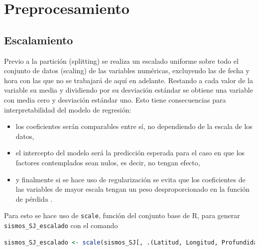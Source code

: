 \documentclass[a4paper]{report}
\begin{document}




\section{Preprocesamiento}


\subsection{Escalamiento}\label{sec:escalamiento}
Previo a la partición (splitting) se realiza un escalado uniforme sobre todo el conjunto de datos (scaling) de las variables numéricas, excluyendo las de fecha y hora con las que no se trabajará de aquí en adelante.
Restando a cada valor de la variable su media y dividiendo por su desviación estándar se obtiene una variable con media cero y desviación estándar uno. 
Esto tiene consecuencias para interpretabilidad del modelo de regresión:
\begin{itemize}
	\item los coeficientes serán comparables entre sí, no dependiendo de la escala de los datos,
	\item el intercepto del modelo será la predicción esperada para el caso en que los factores contemplados sean nulos, es decir, no tengan efecto,
	\item y finalmente si se hace uso de regularización se evita que los coeficientes de las variables de mayor escala tengan un peso desproporcionado en la función de pérdida \cite[sección 3.4.1]{hastie_elements_2009}.
\end{itemize}
Para esto se hace uso de \lstinline[language=R,breaklines=true,basicstyle=\ttfamily]'scale', función del conjunto base de R, para generar \lstinline[language=R,breaklines=true,basicstyle=\ttfamily]'sismos_SJ_escalado' con el comando
\begin{lstlisting}[breaklines=true, language=R]
sismos_SJ_escalado <- scale(sismos_SJ[, .(Latitud, Longitud, Profundidad, Magnitud, `Proxy amplitud`, `Proxy energía`)])
\end{lstlisting} 
\end{document}
